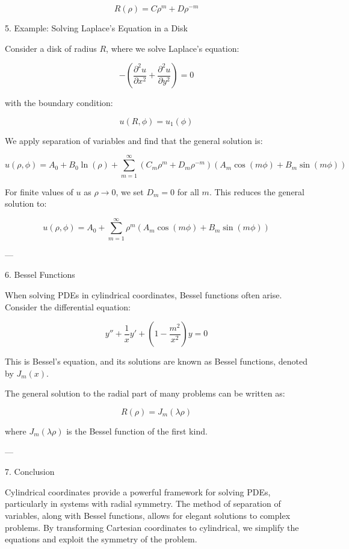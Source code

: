 \[
R(\rho) = C \rho^m + D \rho^{-m}
\]



5. Example: Solving Laplace's Equation in a Disk

Consider a disk of radius \(R\), where we solve Laplace's equation:

\[
-\left( \frac{\partial^2 u}{\partial x^2} + \frac{\partial^2 u}{\partial y^2} \right) = 0
\]

with the boundary condition:

\[
u(R, \phi) = u_1(\phi)
\]

We apply separation of variables and find that the general solution is:

\[
u(\rho, \phi) = A_0 + B_0 \ln(\rho) + \sum_{m=1}^{\infty} (C_m \rho^m + D_m \rho^{-m})(A_m \cos(m \phi) + B_m \sin(m \phi))
\]

For finite values of \( u \) as \( \rho \to 0 \), we set \( D_m = 0 \) for all \( m \). This reduces the general solution to:

\[
u(\rho, \phi) = A_0 + \sum_{m=1}^{\infty} \rho^m (A_m \cos(m \phi) + B_m \sin(m \phi))
\]

---

6. Bessel Functions

When solving PDEs in cylindrical coordinates, Bessel functions often arise. Consider the differential equation:

\[
y'' + \frac{1}{x} y' + \left( 1 - \frac{m^2}{x^2} \right) y = 0
\]

This is Bessel's equation, and its solutions are known as Bessel functions, denoted by \( J_m(x) \).

The general solution to the radial part of many problems can be written as:

\[
R(\rho) = J_m(\lambda \rho)
\]

where \( J_m(\lambda \rho) \) is the Bessel function of the first kind.

---

7. Conclusion

Cylindrical coordinates provide a powerful framework for solving PDEs, particularly in systems with radial symmetry. The method of separation of variables, along with Bessel functions, allows for elegant solutions to complex problems. By transforming Cartesian coordinates to cylindrical, we simplify the equations and exploit the symmetry of the problem.